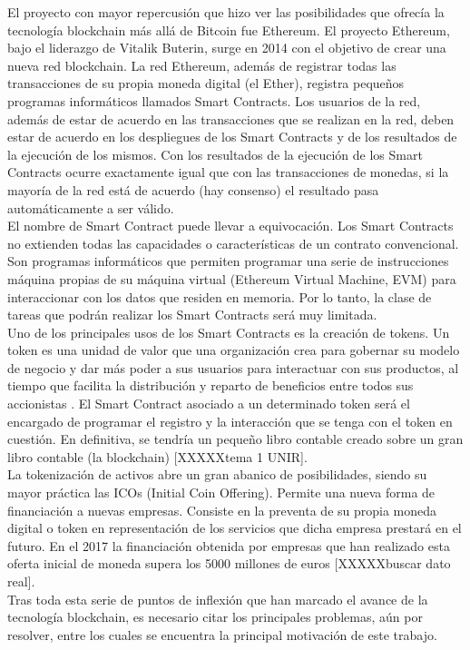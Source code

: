 El proyecto con mayor repercusión que hizo ver las posibilidades que ofrecía la tecnología blockchain más allá de Bitcoin fue Ethereum. El proyecto Ethereum, bajo el liderazgo de Vitalik Buterin, surge en 2014 con el objetivo de crear una nueva red blockchain. La red Ethereum, además de registrar todas las transacciones de su propia moneda digital (el Ether), registra pequeños programas informáticos llamados Smart Contracts. Los usuarios de la red, además de estar de acuerdo en las transacciones que se realizan en la red, deben estar de acuerdo en los despliegues de los Smart Contracts y de los resultados de la ejecución de los mismos. Con los resultados de la ejecución de los Smart Contracts ocurre exactamente igual que con las transacciones de monedas, si la mayoría de la red está de acuerdo (hay consenso) el resultado pasa automáticamente a ser válido. \\
El nombre de Smart Contract puede llevar a equivocación. Los Smart Contracts no extienden todas las capacidades o características de un contrato convencional. Son programas informáticos que permiten programar una serie de instrucciones máquina propias de su máquina virtual (Ethereum Virtual Machine, EVM) para interaccionar con los datos que residen en memoria. Por lo tanto, la clase de tareas que podrán realizar los Smart Contracts será muy limitada. \\
Uno de los principales usos de los Smart Contracts es la creación de tokens. Un token es una unidad de valor que una organización crea para gobernar su modelo de negocio y dar más poder a sus usuarios para interactuar con sus productos, al tiempo que facilita la distribución y reparto de beneficios entre todos sus accionistas \cite{business}. El Smart Contract asociado a un determinado token será el encargado de programar el registro y la interacción que se tenga con el token en cuestión. En definitiva, se tendría un pequeño libro contable creado sobre un gran libro contable (la blockchain) [XXXXXtema 1 UNIR]. \\
La tokenización de activos abre un gran abanico de posibilidades, siendo su mayor práctica las ICOs (Initial Coin Offering). Permite una nueva forma de financiación a nuevas empresas. Consiste en la preventa de su propia moneda digital o token en representación de los servicios que dicha empresa prestará en el futuro. En el 2017 la financiación obtenida por empresas que han realizado esta oferta inicial de moneda supera los 5000 millones de euros [XXXXXbuscar dato real]. \\
Tras toda esta serie de puntos de inflexión que han marcado el avance de la tecnología blockchain, es necesario citar los principales problemas, aún por resolver, entre los cuales se encuentra la principal motivación de este trabajo. \\
